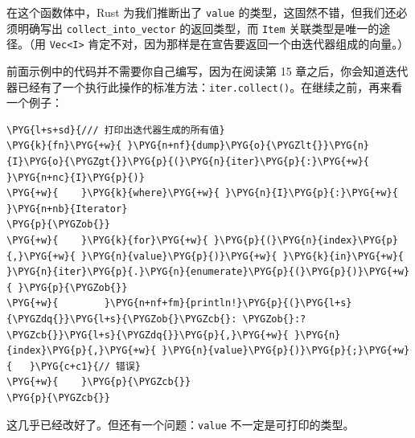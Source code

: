 在这个函数体中，Rust 为我们推断出了 \texttt{value} 的类型，这固然不错，但我们还必须明确写出 \texttt{collect\_into\_vector} 的返回类型，而 \texttt{Item} 关联类型是唯一的途径。（用 \texttt{Vec<I>} 肯定不对，因为那样是在宣告要返回一个由迭代器组成的向量。）

前面示例中的代码并不需要你自己编写，因为在阅读第 15 章之后，你会知道迭代器已经有了一个执行此操作的标准方法：\texttt{iter.collect()}。在继续之前，再来看一个例子：

\begin{Verbatim}[commandchars=\\\{\},breaklines=true,breakanywhere=true,fontsize=\codefont,xleftmargin=17bp]
\PYG{l+s+sd}{/// 打印出迭代器生成的所有值}
\PYG{k}{fn}\PYG{+w}{ }\PYG{n+nf}{dump}\PYG{o}{\PYGZlt{}}\PYG{n}{I}\PYG{o}{\PYGZgt{}}\PYG{p}{(}\PYG{n}{iter}\PYG{p}{:}\PYG{+w}{ }\PYG{n+nc}{I}\PYG{p}{)}
\PYG{+w}{    }\PYG{k}{where}\PYG{+w}{ }\PYG{n}{I}\PYG{p}{:}\PYG{+w}{ }\PYG{n+nb}{Iterator}
\PYG{p}{\PYGZob{}}
\PYG{+w}{    }\PYG{k}{for}\PYG{+w}{ }\PYG{p}{(}\PYG{n}{index}\PYG{p}{,}\PYG{+w}{ }\PYG{n}{value}\PYG{p}{)}\PYG{+w}{ }\PYG{k}{in}\PYG{+w}{ }\PYG{n}{iter}\PYG{p}{.}\PYG{n}{enumerate}\PYG{p}{(}\PYG{p}{)}\PYG{+w}{ }\PYG{p}{\PYGZob{}}
\PYG{+w}{        }\PYG{n+nf+fm}{println!}\PYG{p}{(}\PYG{l+s}{\PYGZdq{}}\PYG{l+s}{\PYGZob{}\PYGZcb{}: \PYGZob{}:?\PYGZcb{}}\PYG{l+s}{\PYGZdq{}}\PYG{p}{,}\PYG{+w}{ }\PYG{n}{index}\PYG{p}{,}\PYG{+w}{ }\PYG{n}{value}\PYG{p}{)}\PYG{p}{;}\PYG{+w}{   }\PYG{c+c1}{// 错误}
\PYG{+w}{    }\PYG{p}{\PYGZcb{}}
\PYG{p}{\PYGZcb{}}
\end{Verbatim}

这几乎已经改好了。但还有一个问题：\texttt{value} 不一定是可打印的类型。

